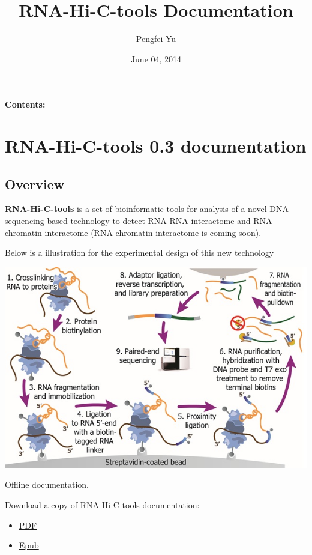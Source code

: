 \documentclass[letterpaper,10pt,english]{sphinxmanual}
\title{RNA-Hi-C-tools Documentation}
\date{June 04, 2014}
\author{Pengfei Yu}
\begin{document}
\maketitle
\tableofcontents
{}\label{index::doc}


\textbf{Contents:}


\chapter{RNA-Hi-C-tools 0.3 documentation}
\label{RNA-Hi-C-tools:welcome-to-rna-hi-c-tools-s-documentation}\label{RNA-Hi-C-tools::doc}\label{RNA-Hi-C-tools:rna-hi-c-tools-version-documentation}

\section{Overview}
\label{RNA-Hi-C-tools:overview}
\textbf{RNA-Hi-C-tools} is a set of bioinformatic tools for analysis of a novel DNA sequencing based technology to detect RNA-RNA interactome and RNA-chromatin interactome (RNA-chromatin interactome is coming soon).

Below is a illustration for the experimental design of this new technology

{\hfill\includegraphics{exp.jpg}\hfill}




Offline documentation.

Download a copy of RNA-Hi-C-tools documentation:
\begin{itemize}
\item {} 
\href{http://systemsbio.ucsd.edu/RNA-Hi-C/\_sources/Stitch-seq-tools.pdf}{PDF}

\item {} 
\href{https://media.readthedocs.org/epub/stitch-seq-tools/latest/stitch-seq-tools.epub}{Epub}

\end{itemize}
\end{document}
